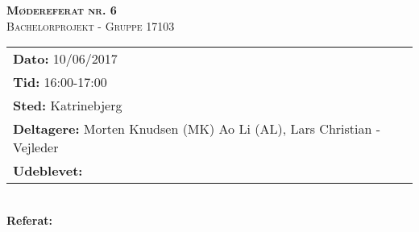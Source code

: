 
\newcommand{\HRule}{\rule{\linewidth}{0.1mm}}


	\begin{center}
		{\huge \bfseries \textsc{Mødereferat nr. 6}}\\
		\textsc{\large Bachelorprojekt - Gruppe 17103}\\[0.3cm]
	\end{center}
	\begin{tabular}{ll}
	\large \textbf{Dato:} 10/06/2017  	\\ %
	\large \textbf{Tid:}  16:00-17:00 	\\ %
	\large \textbf{Sted:} Katrinebjerg		\\ %
	\large \textbf{Deltagere:} Morten Knudsen (MK) Ao Li (AL), Lars Christian - Vejleder \\
	\large \textbf{Udeblevet:} 
	\end{tabular}\\
	\phantom{\,}\hspace{0.1em} \large \textbf{Referat:}
